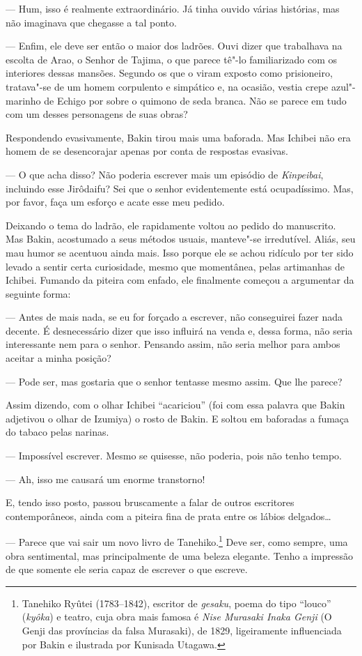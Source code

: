 --- Hum, isso é realmente extraordinário. Já tinha ouvido várias
histórias, mas não imaginava que chegasse a tal ponto.

--- Enfim, ele deve ser então o maior dos ladrões. Ouvi dizer que
trabalhava na escolta de Arao, o Senhor de Tajima, o que parece tê"-lo
familiarizado com os interiores dessas mansões. Segundo os que o viram
exposto como prisioneiro, tratava"-se de um homem corpulento e simpático
e, na ocasião, vestia crepe azul"-marinho de Echigo por sobre o quimono
de seda branca. Não se parece em tudo com um desses personagens de suas
obras?

Respondendo evasivamente, Bakin tirou mais uma baforada. Mas Ichibei não
era homem de se desencorajar apenas por conta de respostas evasivas.

--- O que acha disso? Não poderia escrever mais um episódio de
\textit{Kinpeibai}, incluindo esse Jirôdaifu? Sei que o senhor
evidentemente está ocupadíssimo. Mas, por favor, faça um esforço e
acate esse meu pedido.

Deixando o tema do ladrão, ele rapidamente voltou ao pedido do
manuscrito. Mas Bakin, acostumado a seus métodos usuais, manteve"-se
irredutível. Aliás, seu mau humor se acentuou ainda mais. Isso porque
ele se achou ridículo por ter sido levado a sentir certa curiosidade,
mesmo que momentânea, pelas artimanhas de Ichibei. Fumando da piteira
com enfado, ele finalmente começou a argumentar da seguinte forma:

--- Antes de mais nada, se eu for forçado a escrever, não conseguirei
fazer nada decente. É desnecessário dizer que isso influirá na venda e,
dessa forma, não seria interessante nem para o senhor. Pensando assim,
não seria melhor para ambos aceitar a minha posição?

--- Pode ser, mas gostaria que o senhor tentasse mesmo assim. Que lhe
parece?

Assim dizendo, com o olhar Ichibei ``acariciou'' (foi com essa palavra que
Bakin adjetivou o olhar de Izumiya) o rosto de Bakin. E soltou em 
baforadas a fumaça do tabaco pelas narinas.

--- Impossível escrever. Mesmo se quisesse, não poderia, pois não tenho
tempo.

--- Ah, isso me causará um enorme transtorno!

E, tendo isso posto, passou bruscamente a falar de outros escritores contemporâneos, 
ainda com a piteira fina de prata entre os lábios delgados\ldots{}

\sectionitem
--- Parece que vai sair um novo livro de Tanehiko.\footnote{ Tanehiko Ryûtei 
(1783--1842), escritor de \textit{gesaku}, poema do tipo
``louco'' (\textit{kyôka}) e teatro, cuja obra mais famosa é \textit{Nise
Murasaki Inaka Genji }(O Genji das províncias da falsa Murasaki), de
1829, ligeiramente influenciada por Bakin e ilustrada por Kunisada Utagawa.} 
Deve ser, como sempre, uma obra sentimental, mas
principalmente de uma beleza elegante. Tenho a impressão de que somente
ele seria capaz de escrever o que escreve.

